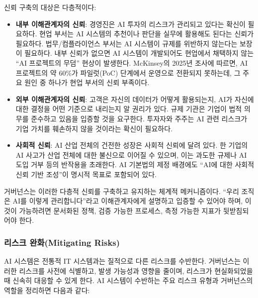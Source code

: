 신뢰 구축의 대상은 다층적이다:

\begin{itemize}
    \item \textbf{내부 이해관계자의 신뢰}: 경영진은 AI 투자의 리스크가 관리되고 있다는 확신이 필요하다. 현업 부서는 AI 시스템의 추천이나 판단을 실무에 활용해도 된다는 신뢰가 필요하다. 법무/컴플라이언스 부서는 AI 시스템이 규제를 위반하지 않는다는 보장이 필요하다. 내부 신뢰가 없으면 AI 시스템이 개발되어도 현업에서 채택하지 않는 ``AI 프로젝트의 무덤'' 현상이 발생한다. McKinsey의 2025년 조사에 따르면, AI 프로젝트의 약 60\%가 파일럿(PoC) 단계에서 운영으로 전환되지 못하는데, 그 주요 원인 중 하나가 현업 부서의 신뢰 부족이다.
    \item \textbf{외부 이해관계자의 신뢰}: 고객은 자신의 데이터가 어떻게 활용되는지, AI가 자신에 대한 결정을 어떤 기준으로 내리는지 알 권리가 있다. 규제 기관은 기업이 법적 의무를 준수하고 있음을 입증할 것을 요구한다. 투자자와 주주는 AI 관련 리스크가 기업 가치를 훼손하지 않을 것이라는 확신이 필요하다.
    \item \textbf{사회적 신뢰}: AI 산업 전체의 건전한 성장은 사회적 신뢰에 달려 있다. 한 기업의 AI 사고가 산업 전체에 대한 불신으로 이어질 수 있으며, 이는 과도한 규제나 AI 도입 거부 등의 반작용을 초래한다. AI 기본법의 제정 배경에도 ``AI에 대한 사회적 신뢰 기반 조성''이 명시적 목표로 포함되어 있다.
\end{itemize}

거버넌스는 이러한 다층적 신뢰를 구축하고 유지하는 체계적 메커니즘이다. ``우리 조직은 AI를 이렇게 관리합니다''라고 이해관계자에게 설명하고 입증할 수 있어야 하며, 이것이 가능하려면 문서화된 정책, 검증 가능한 프로세스, 측정 가능한 지표가 뒷받침되어야 한다.

\subsubsection*{리스크 완화(Mitigating Risks)}
AI 시스템은 전통적 IT 시스템과는 질적으로 다른 리스크를 수반한다. 거버넌스는 이러한 리스크를 사전에 식별하고, 발생 가능성과 영향을 줄이며, 리스크가 현실화되었을 때 신속히 대응할 수 있게 한다. AI 시스템이 수반하는 주요 리스크 유형과 거버넌스의 역할을 정리하면 다음과 같다:

